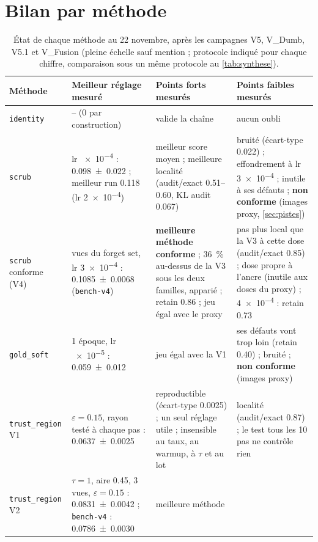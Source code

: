 \documentclass[11pt,a4paper]{article}
\newcommand{\code}[1]{\texttt{#1}}
\begin{document}
\section{Bilan par méthode}\label{sec:bilan}
\begin{table}[ht]
  \centering\small
  \caption{État de chaque méthode au 22 novembre, après les campagnes V5, V\_Dumb, V5.1 et V\_Fusion (pleine échelle sauf mention ; protocole indiqué
  pour chaque chiffre, comparaison sous un même protocole au \cref{tab:synthese}).}\label{tab:bilan}
  \begin{tabularx}{\linewidth}{@{}>{\raggedright}p{2.3cm}>{\raggedright}p{3.4cm}>{\raggedright}X>{\raggedright\arraybackslash}X@{}}
    \toprule
    Méthode & Meilleur réglage mesuré & Points forts mesurés & Points faibles mesurés\\
    \midrule
    \code{identity} & -- (0 par construction) & valide la chaîne & aucun oubli\\
    \code{scrub} & lr \num{e-4} : \num{0.098 +- 0.022} ; meilleur run \num{0.118} (lr \num{2e-4}) &
      meilleur score moyen ; meilleure localité (audit/exact \numrange{0.51}{0.60}, KL audit \num{0.067}) &
      bruité (écart-type \num{0.022}) ; effondrement à lr \num{3e-4} ; inutile à ses défauts ;
      \textbf{non conforme} (images proxy, \cref{sec:pistes})\\
    \code{scrub} conforme (V4) & vues du forget set, lr \num{3e-4} : \num{0.1085 +- 0.0068}
      (\code{bench-v4}) & \textbf{meilleure méthode conforme} ; \SI{36}{\percent} au-dessus de la V3 sous
      les deux familles, apparié ; retain \num{0.86} ; jeu égal avec le proxy & pas plus local que la V3
      à cette dose (audit/exact \num{0.85}) ; dose propre à l'ancre (inutile aux doses du proxy) ;
      \num{4e-4} : retain \num{0.73}\\
    \code{gold\_soft} & 1 époque, lr \num{e-5} : \num{0.059 +- 0.012} & jeu égal avec la V1 &
      ses défauts vont trop loin (retain \num{0.40}) ; bruité ; \textbf{non conforme} (images
      proxy)\\
    \code{trust\_region} V1 & $\varepsilon=\num{0.15}$, rayon testé à chaque pas :
      \num{0.0637 +- 0.0025} & reproductible (écart-type \num{0.0025}) ; un seul réglage utile ;
      insensible au taux, au warmup, à $\tau$ et au lot & localité (audit/exact \num{0.87}) ; le test tous
      les 10 pas ne contrôle rien\\
    \code{trust\_region} V2 & $\tau=1$, aire \num{0.45}, 3 vues, $\varepsilon=\num{0.15}$ :
      \num{0.0831 +- 0.0042} ; \code{bench-v4} : \num{0.0786 +- 0.0030} & meilleure méthode

\end{tabularx}
\end{table}
\end{document}
